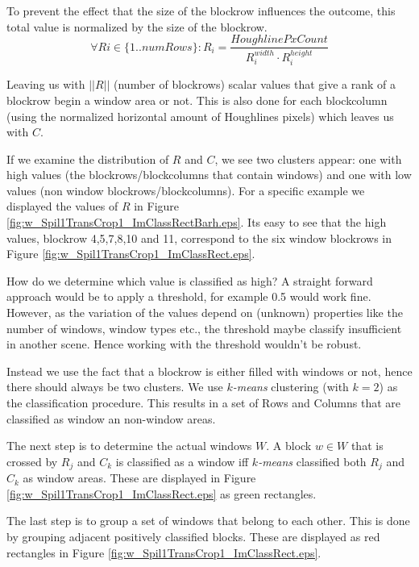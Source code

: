 To prevent the effect that the size of the blockrow influences the outcome, this total value
is normalized by the size of the blockrow.
\[\forall Ri\in \{1..numRows\} : R_i = \frac{HoughlinePxCount}{R_i^{width} \cdot R_i^{height}}\]

Leaving us with $||R||$ (number of blockrows) scalar values that give a rank of a blockrow begin a window area or not.
This is also done for each blockcolumn (using the normalized horizontal amount of
Houghlines pixels) which leaves us with $C$.

If we examine the distribution of $R$ and $C$, we see two clusters appear: one with
high values (the blockrows/blockcolumns that contain windows) and one with low values (non window
blockrows/blockcolumns). For a specific example we displayed the values of $R$ in Figure \ref{fig:w_Spil1TransCrop1_ImClassRectBarh.eps}.
Its easy to see that the high values, blockrow 4,5,7,8,10 and 11, correspond to the
six window blockrows in Figure \ref{fig:w_Spil1TransCrop1_ImClassRect.eps}.

How do we determine which value is classified as high?  A straight forward
approach would be to apply a threshold, for example 0.5 would work fine.
However, as the variation of the values depend on (unknown) properties like the
number of windows, window types etc., the threshold maybe classify insufficient
in another scene.  Hence working with the threshold wouldn't be robust. 

Instead we use the fact that a blockrow is either filled with windows or not, hence
there should always be two clusters.  We use \emph{$k$-means} clustering (with
$k=2$) as the classification procedure.
This results in a set of Rows and Columns that are classified as window an
non-window areas.

The next step is to determine the actual windows $W$.
A block $w\in W$ that is crossed by $R_j$ and $C_k$ is classified as a
window iff \emph{$k$-means} classified both $R_j$ and $C_k$ as window areas. These are displayed in 
 Figure \ref{fig:w_Spil1TransCrop1_ImClassRect.eps} as green rectangles.

The last step is to group a set of windows that belong to each other. This is done by 
grouping adjacent positively classified blocks. These are displayed as red
rectangles in Figure \ref{fig:w_Spil1TransCrop1_ImClassRect.eps}.

